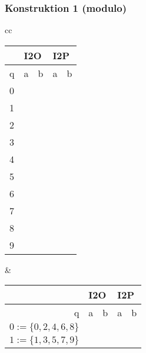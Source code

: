 \begin{frame}
  \frametitle{Konstruktion 1 (modulo)}
  \centering
  \begin{tabular}{cc}
    \begin{tabular}{|l|l|l|l|l|}
      \hline
      & \multicolumn{2}{l|}{I2O} & \multicolumn{2}{l|}{I2P} \\\hline
    q & a           & b          & a           & b          \\\hline\hline
    \cellcolor[HTML]{DAE8FC}0  &             &            &             &            \\\hline
    1 &             &            &             &            \\\hline
    \cellcolor[HTML]{DAE8FC}2 &             &            &             &            \\\hline
    3 &             &            &             &            \\\hline
    \cellcolor[HTML]{DAE8FC}4 &             &            &             &            \\\hline
    5 &             &            &             &            \\\hline
    \cellcolor[HTML]{DAE8FC}6 &             &            &             &            \\\hline
    7 &             &            &             &            \\\hline
    \cellcolor[HTML]{DAE8FC}8 &             &            &             &            \\\hline
    9 &             &            &             &           \\\hline
    \end{tabular}
    &
    \begin{tabular}{|r|r|r|r|r|}
      \hline
      & \multicolumn{2}{l|}{I2O} & \multicolumn{2}{l|}{I2P} \\\hline
    q & a           & b          & a           & b          \\\hline\hline
    \cellcolor[HTML]{DAE8FC}$0:=\{0,2,4,6,8\}$  &             &            &             &            \\\hline
    $1:=\{1,3,5,7,9\}$ &             &            &             &            \\\hline
    \end{tabular}
    \end{tabular}
\end{frame}

